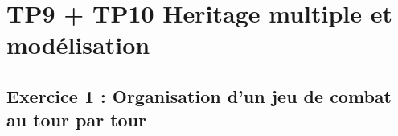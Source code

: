\chapter{TP9 + TP10 Heritage multiple et modélisation}
        \section{Exercice 1 : Organisation d’un jeu de combat au tour par tour}
